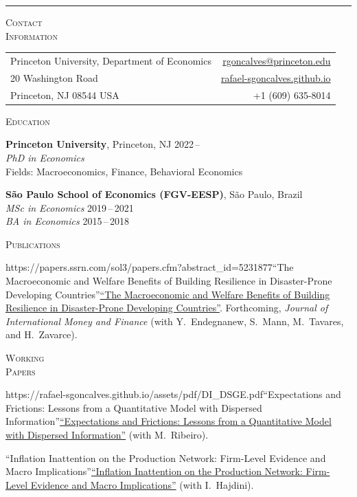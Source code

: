 \documentclass[11pt, letterpaper]{article}
\newlength{\seclabelwidth}
\newenvironment{cvsection}[1]{%
  \vspace{1.2em}%
  \noindent\begin{minipage}[t]{\seclabelwidth}%
    \raggedright\textsc{#1}%
  \end{minipage}%
  \hspace{0.8em}%
  \begin{minipage}[t]{\dimexpr\textwidth-\seclabelwidth-0.8em}%
}{%
  \end{minipage}\par%
}
\newcommand{\paper}[3][]{%
  \def\tempurl{#1}%
  \ifx\tempurl\empty``#2''\else\href{#1}{``#2''}\fi#3%
}
\begin{document}
\vspace{0.2em}
\hrule
\vspace{0.8em}

\begin{cvsection}{Contact\\Information}
  \begin{tabularx}{\linewidth}{@{}X r@{}}
    Princeton University, Department of Economics & \href{mailto:rgoncalves@princeton.edu}{rgoncalves@princeton.edu} \\
     20 Washington Road & \href{https://rafael-sgoncalves.github.io}{rafael-sgoncalves.github.io} \\
    Princeton, NJ 08544 USA & +1 (609) 635-8014
  \end{tabularx}
\end{cvsection}

\begin{cvsection}{Education}
  \textbf{Princeton University}, Princeton, NJ \hfill 2022\,-- \\
  \textit{PhD in Economics} \\
  Fields: Macroeconomics, Finance, Behavioral Economics

  \vspace{0.7em}

  \textbf{S\~{a}o Paulo School of Economics (FGV-EESP)}, S\~{a}o Paulo, Brazil \\
  \textit{MSc in Economics} \hfill 2019\,--\,2021 \\
  \textit{BA in Economics} \hfill 2015\,--\,2018
\end{cvsection}

\begin{cvsection}{Publications}
  \paper[https://papers.ssrn.com/sol3/papers.cfm?abstract_id=5231877]{The Macroeconomic and Welfare Benefits of Building Resilience in Disaster-Prone Developing Countries}{. Forthcoming, \textit{Journal of International Money and Finance}} (with Y.\ Endegnanew, S.\ Mann, M.\ Tavares, and H.\ Zavarce).
\end{cvsection}

\begin{cvsection}{Working\\Papers}
  \paper[https://rafael-sgoncalves.github.io/assets/pdf/DI_DSGE.pdf]{Expectations and Frictions: Lessons from a Quantitative Model with Dispersed Information}{} (with M.\ Ribeiro).

  \vspace{0.7em}

  \paper{Inflation Inattention on the Production Network: Firm-Level Evidence and Macro Implications}{} (with I.\ Hajdini).
\end{cvsection}
\end{document}
